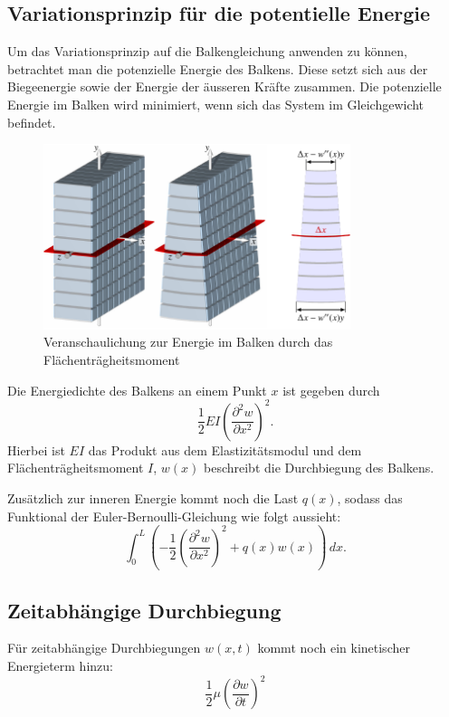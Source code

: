 \subsection{Variationsprinzip für die potentielle Energie}
Um das Variationsprinzip auf die Balkengleichung anwenden zu können, betrachtet man die potenzielle Energie des Balkens. Diese setzt sich aus der Biegeenergie sowie der Energie der äusseren Kräfte zusammen. Die potenzielle Energie im Balken wird minimiert, wenn sich das System im Gleichgewicht befindet.
\begin{figure}
	\centering
	\includegraphics[width=0.8\textwidth]{papers/balken/images/teil2/federgesetz.pdf}
	\caption{Veranschaulichung zur Energie im Balken durch das Flächenträgheitsmoment}
	\label{fig:Veranschaulichung zur Energie im Balken durch das Flächenträgheitsmoment}
\end{figure}

Die Energiedichte des Balkens an einem Punkt $x$ ist gegeben durch
\begin{equation}
	\frac{1}{2} E I \left( \frac{\partial^2 w}{\partial x^2} \right)^2.
\end{equation}
Hierbei ist $E I$ das Produkt aus dem Elastizitätsmodul und dem Flächenträgheitsmoment $I$, $w(x)$ beschreibt die Durchbiegung des Balkens.

Zusätzlich zur inneren Energie kommt noch die Last $q(x)$, sodass das Funktional der Euler-Bernoulli-Gleichung wie folgt aussieht:
\begin{equation}
	\int_0^L \left( -\frac{1}{2} \left( \frac{\partial^2 w}{\partial x^2} \right)^2 + q(x) w(x) \right) \, dx.
\end{equation}

\subsection{Zeitabhängige Durchbiegung}
Für zeitabhängige Durchbiegungen $w(x,t)$ kommt noch ein kinetischer Energieterm hinzu:
\begin{equation}
	\frac{1}{2} \mu \left( \frac{\partial w}{\partial t} \right)^2
\end{equation}

